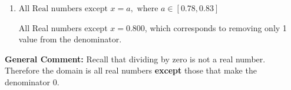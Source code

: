\documentclass{extbook}[14pt]
\begin{document}
\begin{enumerate}
{\begin{enumerate}[label=\Alph*.]
All Real numbers except $x = 20.000$ and $x = 30.000$, which corresponds to not factoring the denominator correctly.
\item \( \text{All Real numbers except } x = a, \text{ where } a \in [0.78, 0.83] \)

All Real numbers except $x = 0.800$, which corresponds to removing only 1 value from the denominator.
\end{enumerate}

\textbf{General Comment:} Recall that dividing by zero is not a real number. Therefore the domain is all real numbers \textbf{except} those that make the denominator 0.
}
\end{enumerate}
\end{document}
